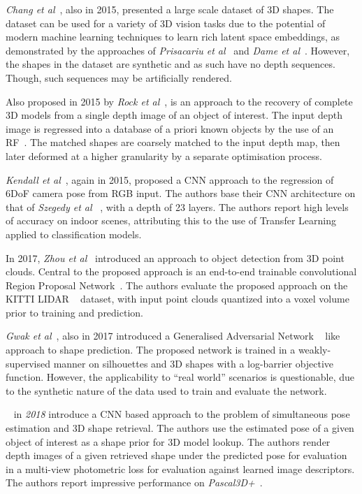 \textit{Chang et al}~\cite{Chang2015}, also in 2015, presented a large scale dataset of 3D shapes. The 
dataset can be used for a variety of 3D vision tasks due to the potential of modern machine learning 
techniques to learn rich latent space embeddings, as demonstrated by the approaches of 
\textit{Prisacariu et al}~\cite{Prisacariu2011} and \textit{Dame et al}~\cite{Dame2013}. However, the 
shapes in the dataset are synthetic and as such have no depth sequences. Though, such sequences may be 
artificially rendered.

Also proposed in 2015 by \textit{Rock et al}~\cite{Rock2015}, is an approach to the recovery of complete 
3D models from a single depth image of an object of interest. The input depth image is regressed into a 
database of a priori known objects by the use of an RF~\cite{Ho1995}. The matched shapes are 
coarsely matched to the input depth map, then later deformed at a higher granularity by a separate 
optimisation process.

\textit{Kendall et al}~\cite{Kendall2015}, again in 2015, proposed a CNN approach to the regression of 
6DoF camera pose from RGB input. The authors base their CNN architecture on that of \textit{Szegedy et al}
~\cite{Szegedy2014}, with a depth of 23 layers. The authors report high levels of accuracy on indoor scenes, 
attributing this to the use of Transfer Learning~\cite{Pan2010} applied to classification models.

In 2017, \textit{Zhou et al}~\cite{Zhou2017} introduced an approach to object detection from 3D point 
clouds. Central to the proposed approach is an end-to-end trainable convolutional Region Proposal 
Network~\cite{Girshick2015_2}. The authors evaluate the proposed approach on the KITTI LIDAR
~\cite{Geiger2013} dataset, with input point clouds quantized into a voxel volume prior to training 
and prediction.

\textit{Gwak et al}~\cite{Gwak2017}, also in 2017 introduced a Generalised Adversarial Network
~\cite{Goodfellow2014} like approach to shape prediction. The proposed network is trained in a 
weakly-supervised manner on silhouettes and 3D shapes with a log-barrier objective function. 
However, the applicability to ``real world'' scenarios is questionable, due to the synthetic nature of 
the data used to train and evaluate the network.

~\cite{Grabner18} in \textit{2018} introduce a CNN based approach to the problem of 
simultaneous pose estimation and 3D shape retrieval. The authors use the estimated pose of a given 
object of interest as a shape prior for 3D model lookup. The authors render depth images of a given retrieved 
shape under the predicted pose for evaluation in a multi-view photometric loss for evaluation against 
learned image descriptors. The authors report impressive performance on \textit{Pascal3D+}~\cite{Xiang2014}.


